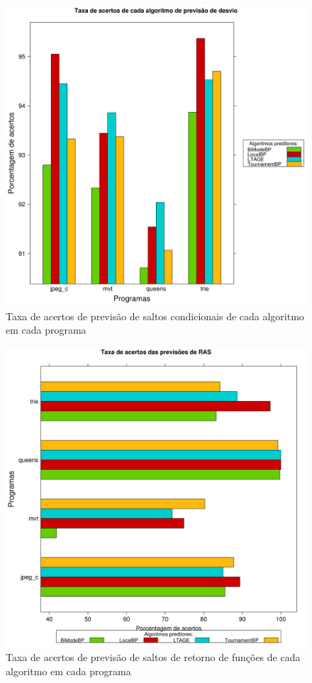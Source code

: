 \documentclass[12pt]{article}
\begin{document}
\begin{figure}[!htbp]
	
	\centering
	\includegraphics[scale=0.25]{Taxa_Acertos.png}
	\caption{Taxa de acertos de previsão de saltos condicionais de cada algoritmo em cada programa}
	\label{figura1}
    
\end{figure}

\begin{figure}[!htbp]
	
	\centering
	\includegraphics[scale=0.25]{Taxa_Acertos_RAS.png}
	\caption{Taxa de acertos de previsão de saltos de retorno de funções de cada algoritmo em cada programa}
	\label{figura2}
    
\end{figure}
\end{document}
